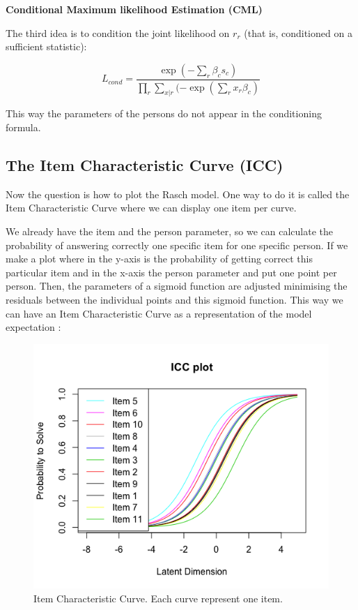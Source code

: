 \vspace{5 mm}

\textbf{Conditional Maximum likelihood Estimation (CML)}

The third idea is to condition the joint likelihood on $r_r$ \cite{mair2009extended} (that is, conditioned on a sufficient statistic):

\vspace{5 mm}
\begin{equation}
L_{cond}= \frac{\exp(-\sum_r \beta_c s_c)}{\prod_r \sum_{x|r} ( -\exp(\sum_r x_r \beta_c)}
\end{equation}
\vspace{5 mm}

This way the parameters of the persons do not appear in the conditioning formula. 

\subsection{The Item Characteristic Curve (ICC)}

Now the question is how to plot the Rasch model. One way to do it is called the Item Characteristic Curve where we can display one item per curve. 

We already have the item and the person parameter, so we can calculate the probability of answering correctly one specific item for one specific person. If we make a plot where in the y-axis is the probability of getting correct this particular item and in the x-axis the person parameter and put one point per person. Then, the parameters of a sigmoid function are adjusted minimising the residuals between the individual points and this sigmoid function. This way we can have an Item Characteristic Curve as a representation of the model expectation \cite{demars2010item}:

\begin{figure}[ht!]
  \centering
  \includegraphics[width=.85\linewidth]{img/rasch_ICC.png}
  \caption{Item Characteristic Curve. Each curve represent one item.}
  \label{img:rasch_icc}
\end{figure}

